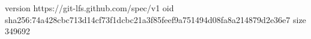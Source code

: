 version https://git-lfs.github.com/spec/v1
oid sha256:74a428cbc713d14cf73f1dcbc21a3f85feef9a751494d08fa8a214879d2e36e7
size 349692
